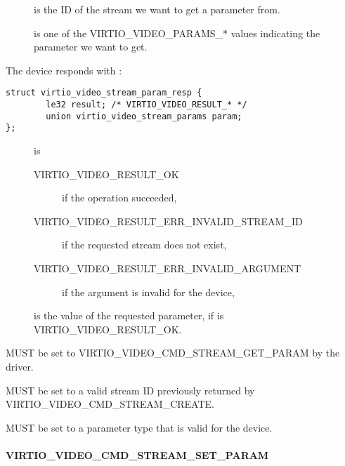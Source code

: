 \begin{description}
\item[]
is the ID of the stream we want to get a parameter from.
\item[]
is one of the VIRTIO\_VIDEO\_PARAMS\_* values indicating the parameter
we want to get.
\end{description}

The device responds with :

\begin{lstlisting}
struct virtio_video_stream_param_resp {
        le32 result; /* VIRTIO_VIDEO_RESULT_* */
        union virtio_video_stream_params param;
};
\end{lstlisting}

\begin{description}
\item[]
is

\begin{description}
\item[VIRTIO\_VIDEO\_RESULT\_OK]
if the operation succeeded,
\item[VIRTIO\_VIDEO\_RESULT\_ERR\_INVALID\_STREAM\_ID]
if the requested stream does not exist,
\item[VIRTIO\_VIDEO\_RESULT\_ERR\_INVALID\_ARGUMENT]
if the  argument is invalid for the device,
\end{description}
\item[]
is the value of the requested parameter, if  is
VIRTIO\_VIDEO\_RESULT\_OK.
\end{description}


 MUST be set to VIRTIO\_VIDEO\_CMD\_STREAM\_GET\_PARAM
by the driver.

 MUST be set to a valid stream ID previously returned
by VIRTIO\_VIDEO\_CMD\_STREAM\_CREATE.

 MUST be set to a parameter type that is valid for the
device.

\paragraph{VIRTIO_VIDEO_CMD_STREAM_SET_PARAM}\label{sec:Device Types / Video Device / Device Operation / Device Operation: Stream commands / VIRTIO_VIDEO_CMD_STREAM_SET_PARAM}

